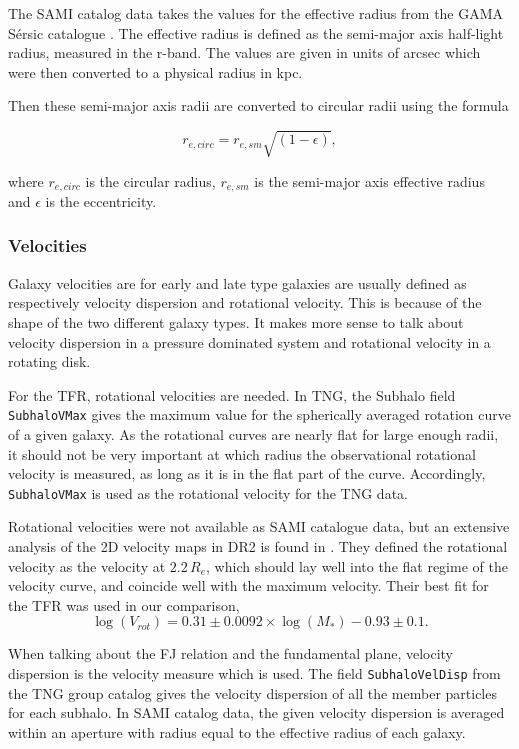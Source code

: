 The SAMI catalog data takes the values for the effective radius from the GAMA Sérsic catalogue \parencite{Driver2011}. The effective radius is defined as the semi-major axis half-light radius, measured in the r-band. The values are given in units of arcsec which were then converted to a physical radius in kpc.

Then these semi-major axis radii are converted to circular radii using the formula

\begin{equation}
   r_{e, circ} = r_{e, sm}\sqrt{(1-\epsilon)},
\end{equation}

where $r_{e, circ}$ is the circular radius, $r_{e,sm}$ is the semi-major axis effective radius and $\epsilon$ is the eccentricity.

\subsubsection{Velocities}

Galaxy velocities are for early and late type galaxies are usually defined as respectively velocity dispersion and rotational velocity. This is because of the shape of the two different galaxy types. It makes more sense to talk about velocity dispersion in a pressure dominated system and rotational velocity in a rotating disk.

For the TFR, rotational velocities are needed. In TNG, the Subhalo field \texttt{SubhaloVMax} gives the maximum value for the spherically averaged rotation curve of a given galaxy. As the rotational curves are nearly flat for large enough radii, it should not be very important at which radius the observational rotational velocity is measured, as long as it is in the flat part of the curve. Accordingly, \texttt{SubhaloVMax} is used as the rotational velocity for the TNG data.

Rotational velocities were not available as SAMI catalogue data, but an extensive analysis of the 2D velocity maps in DR2 is found in \textcite{Bloom2017}. They defined the rotational velocity as the velocity at $2.2\, R_e$, which should lay well into the flat regime of the velocity curve, and coincide well with the maximum velocity. Their best fit for the TFR was used in our comparison, 
\begin{equation}
	\log(V_{rot}) = 0.31 \pm 0.0092 \times \log(M_*)-0.93 \pm 0.1.
\end{equation}

When talking about the FJ relation and the fundamental plane, velocity dispersion is the velocity measure which is used. The field \texttt{SubhaloVelDisp} from the TNG group catalog gives the velocity dispersion of all the member particles for each subhalo. In SAMI catalog data, the given velocity dispersion is averaged within an aperture with radius equal to the effective radius of each galaxy.